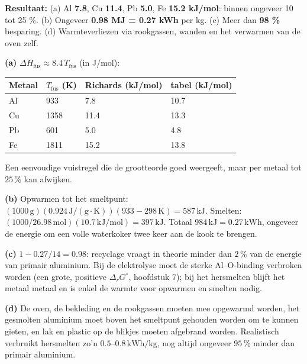 \begin{oplossing}
\textbf{Resultaat:} (a) Al \textbf{7.8}, Cu \textbf{11.4}, Pb \textbf{5.0}, Fe \textbf{15.2 kJ/mol}: binnen ongeveer 10 tot 25 \%. (b) Ongeveer \textbf{0.98 MJ = 0.27 kWh} per kg. (c) Meer dan \textbf{98 \%} besparing. (d) Warmteverliezen via rookgassen, wanden en het verwarmen van de oven zelf.

\textbf{(a)} \(\Delta H_{\text{fus}} \approx 8.4\,T_{\text{fus}}\) (in J/mol):

\begin{center}
\begin{tabular}{llll}
\toprule
Metaal & \(T_{\text{fus}}\) (K) & Richards (kJ/mol) & tabel (kJ/mol) \\
\midrule
Al & 933 & 7.8 & 10.7 \\
Cu & 1358 & 11.4 & 13.3 \\
Pb & 601 & 5.0 & 4.8 \\
Fe & 1811 & 15.2 & 13.8 \\
\bottomrule
\end{tabular}
\end{center}

Een eenvoudige vuistregel die de grootteorde goed weergeeft, maar per metaal tot \(25\,\%\) kan afwijken.

\textbf{(b)} Opwarmen tot het smeltpunt: \((1000\,\mathrm{g})(0.924\,\mathrm{J/(g\cdot K)})(933 - 298\,\mathrm{K}) = 587\,\mathrm{kJ}\). Smelten: \((1000/26.98\,\mathrm{mol})(10.7\,\mathrm{kJ/mol}) = 397\,\mathrm{kJ}\). Totaal \(984\,\mathrm{kJ} = 0.27\,\mathrm{kWh}\), ongeveer de energie om een volle waterkoker twee keer aan de kook te brengen.

\textbf{(c)} \(1 - 0.27/14 = 0.98\): recyclage vraagt in theorie minder dan \(2\,\%\) van de energie van primair aluminium. Bij de elektrolyse moet de sterke Al--O-binding verbroken worden (een grote, positieve \(\Delta_rG^\circ\), hoofdstuk 7); bij het hersmelten blijft het metaal metaal en is enkel de warmte voor opwarmen en smelten nodig.

\textbf{(d)} De oven, de bekleding en de rookgassen moeten mee opgewarmd worden, het gesmolten aluminium moet boven het smeltpunt gehouden worden om te kunnen gieten, en lak en plastic op de blikjes moeten afgebrand worden. Realistisch verbruikt hersmelten zo'n \(0.5\)--\(0.8\,\mathrm{kWh/kg}\), nog altijd ongeveer \(95\,\%\) minder dan primair aluminium.
\end{oplossing}

